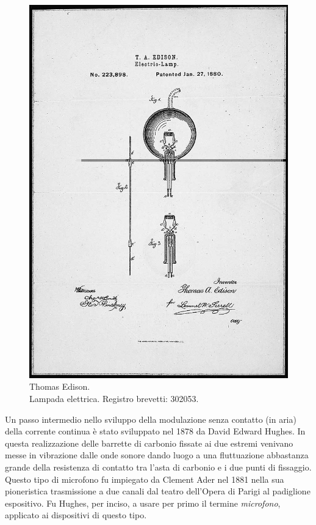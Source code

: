 \begin{refsection}
\begin{figure}[th!]
\centering
\includegraphics[width=0.99\columnwidth]{CAPITOLI/0200/img/light-patent-drawing-l.png}
\caption[]{Thomas Edison. \\ Lampada elettrica. Registro brevetti: 302053.}
\label{te:lamp}
\end{figure}

Un passo intermedio nello sviluppo della modulazione senza contatto (in aria) della
corrente continua è stato sviluppato nel 1878 da David Edward Hughes. In questa
realizzazione delle barrette di carbonio fissate ai due estremi venivano messe in
vibrazione dalle onde sonore dando luogo a una fluttuazione abbastanza grande
della resistenza
di contatto tra l'asta di carbonio e i due punti di fissaggio. Questo tipo di
microfono fu impiegato da Clement Ader nel 1881 nella sua pioneristica trasmissione a due
canali dal teatro dell'Opera di Parigi al padiglione espositivo.
Fu Hughes, per inciso, a usare per primo il termine \emph{microfono}, applicato
ai dispositivi di questo tipo.


\end{refsection}
